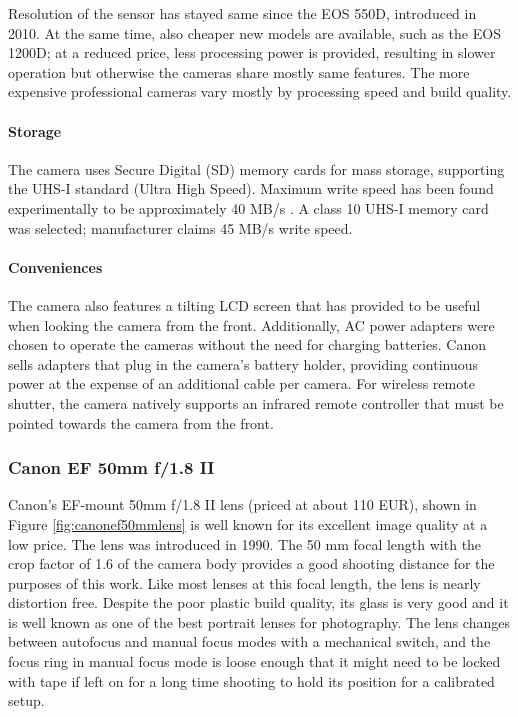 Resolution of the sensor has stayed same since the EOS 550D, introduced in 2010.
At the same time, also cheaper new models are available, such as the EOS 1200D; at a reduced price, less processing power is provided, resulting in slower operation but otherwise the cameras share mostly same features.
The more expensive professional cameras vary mostly by processing speed and build quality.

\paragraph{Storage}
The camera uses Secure Digital (SD) memory cards for mass storage, supporting the UHS-I standard (Ultra High Speed).
Maximum write speed has been found experimentally to be approximately 40 MB/s \cite{magiclanternforum}.
A class 10 UHS-I memory card was selected; manufacturer claims 45 MB/s write speed.

\paragraph{Conveniences}
The camera also features a tilting LCD screen that has provided to be useful when looking the camera from the front.
Additionally, AC power adapters were chosen to operate the cameras without the need for charging batteries.
Canon sells adapters that plug in the camera's battery holder, providing continuous power at the expense of an additional cable per camera.
For wireless remote shutter, the camera natively supports an infrared remote controller that must be pointed towards the camera from the front.


\subsubsection{Canon EF 50mm f/1.8 II}

Canon's EF-mount 50mm f/1.8 II lens (priced at about 110 EUR), shown in Figure \ref{fig:canonef50mmlens} is well known for its excellent image quality at a low price.
The lens was introduced in 1990.
The 50 mm focal length with the crop factor of 1.6 of the camera body provides a good shooting distance for the purposes of this work.
Like most lenses at this focal length, the lens is nearly distortion free.
Despite the poor plastic build quality, its glass is very good and it is well known as one of the best portrait lenses for photography.
The lens changes between autofocus and manual focus modes with a mechanical switch, and the focus ring in manual focus mode is loose enough that it might need to be locked with tape if left on for a long time shooting to hold its position for a calibrated setup.

